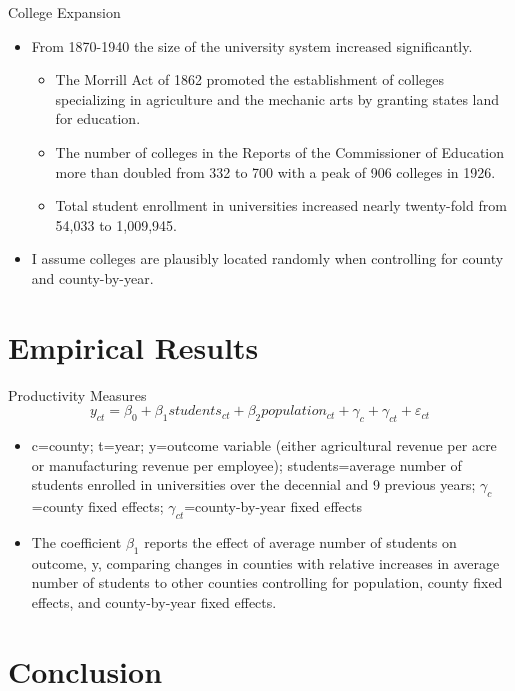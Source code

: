 \documentclass{beamer}
\begin{document}
\begin{frame}{College Expansion}
\begin{itemize}
\item From 1870-1940 the size of the university system increased significantly. 
\begin{itemize}
\item The Morrill Act of 1862 promoted the establishment of colleges specializing in agriculture and the mechanic arts by granting states land for education. 
\item The number of colleges in the Reports of the Commissioner of Education more than doubled from 332 to 700 with a peak of 906 colleges in 1926.
\item Total student enrollment in universities increased nearly twenty-fold from 54,033 to 1,009,945.
\end{itemize}
\item I assume colleges are plausibly located randomly when controlling for county and county-by-year.
\end{itemize}
\end{frame}

\section{Empirical Results}
\begin{frame}{Productivity Measures}
\begin{equation*}
y_{ct}=\beta_0+\beta_1students_{ct}+\beta_2population_{ct}+\gamma_c+\gamma_{ct}+\varepsilon_{ct}
\end{equation*}
\begin{itemize}
\item c=county; t=year; y=outcome variable (either agricultural revenue per acre or manufacturing revenue per employee); students=average number of students enrolled in universities over the decennial and 9 previous years; $\gamma_c$=county fixed effects; $\gamma_{ct}$=county-by-year fixed effects
\item The coefficient $\beta_1$ reports the effect of average number of students on outcome, y, comparing changes in counties with relative increases in average number of students to other counties controlling for population, county fixed effects, and county-by-year fixed effects.
\end{itemize}
\end{frame}

\section{Conclusion}
\end{document}
